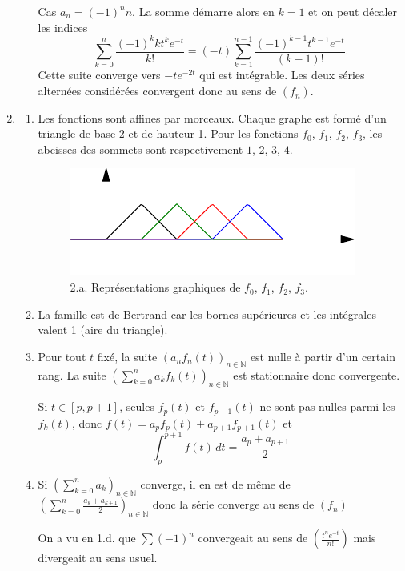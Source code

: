 \begin{enumerate}
\begin{enumerate}
Cas $a_{n}=(-1)^{n}n$. La somme démarre alors en $k=1$ et on peut décaler les indices
\begin{displaymath}
  \sum _{k=0}^{n}\frac{(-1)^{k} k t^{k}e^{-t}}{k!}= (-t)\sum _{k=1}^{n-1}\frac{(-1)^{k-1}t^{k-1}e^{-t}}{(k-1)!}.
\end{displaymath}
Cette suite converge vers $-te^{-2t}$ qui est intégrable. Les deux séries alternées considérées convergent donc au sens de $(f_{n})$.
\end{enumerate}
\item \begin{enumerate}
\item Les fonctions sont affines par morceaux. Chaque graphe est formé d'un triangle de base 2 et de hauteur 1. Pour les fonctions $f_0$, $f_1$, $f_2$, $f_3$, les abcisses des sommets sont respectivement $1$, $2$, $3$, $4$.
\begin{figure}
   \centering
   \includegraphics{Cbertr_1.pdf}
   \caption{2.a. Représentations graphiques de $f_0$, $f_1$, $f_2$, $f_3$.}
\end{figure}
\item La famille est de Bertrand car les bornes supérieures et les intégrales valent 1 (aire du triangle).
\item Pour tout $t$ fixé, la suite $(a_n f_{n}(t))_{n\in \mathbb{N}}$ est nulle à partir d'un certain rang. La suite $(\sum _{k=0}^{n}a_k f_{k}(t))_{n\in \mathbb{N}}$ est stationnaire donc convergente.

Si $t\in [p,p+1]$, seules $f_{p}(t)$ et $f_{p+1}(t)$ ne sont pas nulles parmi les $f_{k}(t)$, donc $f(t)=a_{p}f_{p}(t)+ a_{p+1}f_{p+1}(t)$ et
$$\int_{p}^{p+1}f(t)\,dt=\frac{a_{p}+a_{p+1}}{2}$$
\item Si $(\sum _{k=0}^{n}a_{k})_{n\in \mathbb{N}}$ converge, il en est de même de $(\sum _{k=0}^{n} \frac{ a_{k}+ a_{k+1}}{2})_{n\in \mathbb{N}}$ donc la série converge au sens de $(f_{n})$

On a vu en 1.d. que $\sum (-1)^{n}$ convergeait au sens de $(\frac{t^{n}e^{-t}}{n!})$ mais divergeait au sens usuel.
\end{enumerate}
\end{enumerate}
